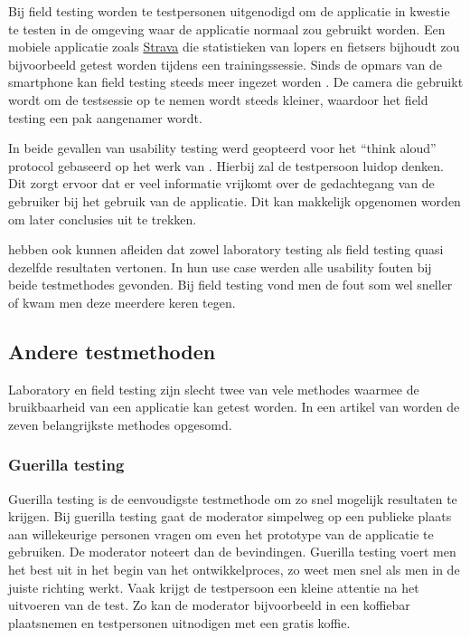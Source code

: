 Bij field testing worden te testpersonen uitgenodigd om de applicatie in kwestie te testen in de omgeving waar de applicatie normaal zou gebruikt worden. Een mobiele applicatie zoals \href{https://www.strava.com/}{Strava} die statistieken van lopers en fietsers bijhoudt zou bijvoorbeeld getest worden tijdens een trainingssessie. Sinds de opmars van de smartphone kan field testing steeds meer ingezet worden \autocite{Kjeldskov2004}. De camera die gebruikt wordt om de testsessie op te nemen wordt steeds kleiner, waardoor het field testing een pak aangenamer wordt.

In beide gevallen van usability testing werd geopteerd voor het ``think aloud'' protocol gebaseerd op het werk van \textcite{Ericsson1984}. Hierbij zal de testpersoon luidop denken. Dit zorgt ervoor dat er veel informatie vrijkomt over de gedachtegang van de gebruiker bij het gebruik van de applicatie. Dit kan makkelijk opgenomen worden om later conclusies uit te trekken.

\textcite{Kaikkonen2005} hebben ook kunnen afleiden dat zowel laboratory testing als field testing quasi dezelfde resultaten vertonen. In hun use case werden alle usability fouten bij beide testmethodes gevonden. Bij field testing vond men de fout som wel sneller of kwam men deze meerdere keren tegen.

\subsection{Andere testmethoden}
\label{sec:usability-testing:testmethoden}

Laboratory en field testing zijn slecht twee van vele methodes waarmee de bruikbaarheid van een applicatie kan getest worden. In een artikel van \textcite{Babich2019} worden de zeven belangrijkste methodes opgesomd.


\subsubsection{Guerilla testing}
\label{sec:usability-testing:testmethoden:guerilla}

Guerilla testing is de eenvoudigste testmethode om zo snel mogelijk resultaten te krijgen. Bij guerilla testing gaat de moderator simpelweg op een publieke plaats aan willekeurige personen vragen om even het prototype van de applicatie te gebruiken. De moderator noteert dan de bevindingen. Guerilla testing voert men het best uit in het begin van het ontwikkelproces, zo weet men snel als men in de juiste richting werkt. Vaak krijgt de testpersoon een kleine attentie na het uitvoeren van de test. Zo kan de moderator bijvoorbeeld in een koffiebar plaatsnemen en testpersonen uitnodigen met een gratis koffie.

